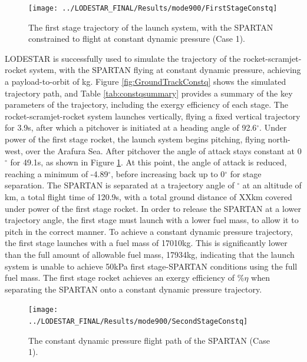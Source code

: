 \begin{figure}[ht!]
	\centering
	\texttt{[image: ../LODESTAR\_FINAL/Results/mode900/FirstStageConstq]}
	\caption{The first stage trajectory of the launch system, with the SPARTAN constrained to flight at constant dynamic pressure (Case 1).}
	\label{fig:FirstStageConstq}
\end{figure}
LODESTAR is successfully used to simulate the trajectory of the rocket-scramjet-rocket system, with the SPARTAN flying at constant dynamic pressure, achieving a payload-to-orbit of \PayloadToOrbitConstq kg.
Figure \ref{fig:GroundTrackConstq} shows the simulated trajectory path, and Table \ref{tab:constqsummary} provides a summary of the key parameters of the trajectory, including the exergy efficiency of each stage.
The rocket-scramjet-rocket system launches vertically, flying a fixed vertical trajectory for 3.9s, after which a pitchover is initiated at a heading angle of 92.6$^\circ$. Under power of the first stage rocket, the launch system begins pitching, flying north-west, over the Arafura Sea. 
After pitchover the angle of attack stays constant at 0$^\circ$ for 49.1s, as shown in Figure \ref{fig:FirstStageConstq}. At this point, the angle of attack is reduced, reaching a minimum of -4.89$^\circ$, before increasing back up to 0$^\circ$ for stage separation. 
The SPARTAN is separated at a trajectory angle of \firstsecondSeparationgammaConstq$^\circ$ at an altitude of \firstsecondSeparationAltConstq km, a total flight time of 120.9s, with a total ground distance of XXkm covered under power of the first stage rocket. 
 In order to release the SPARTAN at a lower trajectory angle, the first stage must launch with a lower fuel mass, to allow it to pitch in the correct manner. To achieve a constant dynamic pressure trajectory, the first stage launches with a fuel mass of 17010kg. This is significantly lower than the full amount of allowable fuel mass, 17934kg, indicating that the launch system is unable to achieve 50kPa first stage-SPARTAN conditions using the full fuel mass. 
The first stage rocket achieves an exergy efficiency of \firstExergyEffConstq \%$\eta$ when separating the SPARTAN onto a constant dynamic pressure trajectory. 


\begin{figure}[ht!]
\centering
\texttt{[image: ../LODESTAR\_FINAL/Results/mode900/SecondStageConstq]}
\caption{The constant dynamic pressure flight path of the SPARTAN (Case 1).}
\label{fig:SecondStageConstq}
\end{figure}


